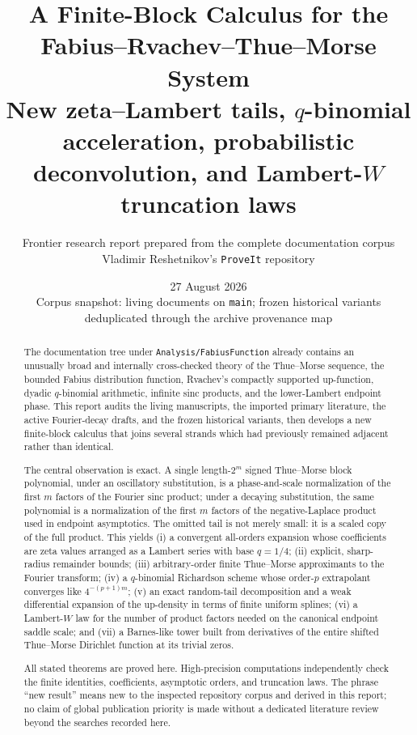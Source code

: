 \documentclass[11pt,oneside]{article}
\title{\bfseries A Finite-Block Calculus for the\\ Fabius--Rvachev--Thue--Morse System\\[0.4em]
\large New zeta--Lambert tails, $q$-binomial acceleration, probabilistic deconvolution, and Lambert-$W$ truncation laws}
\author{Frontier research report prepared from the complete documentation corpus\\
\small Vladimir Reshetnikov's \texttt{ProveIt} repository}
\date{27 August 2026\\
\small Corpus snapshot: living documents on \texttt{main}; frozen historical variants deduplicated through the archive provenance map}
\numberwithin{equation}{section}
\theoremstyle{definition}
\theoremstyle{remark}
\newcommand{\repo}{\nolinkurl{Analysis/FabiusFunction}}
\begin{document}
\maketitle

\begin{abstract}
The documentation tree under \repo{} already contains an unusually broad and internally
cross-checked theory of the Thue--Morse sequence, the bounded Fabius distribution function,
Rvachev's compactly supported up-function, dyadic $q$-binomial arithmetic, infinite sinc
products, and the lower-Lambert endpoint phase.  This report audits the living manuscripts,
the imported primary literature, the active Fourier-decay drafts, and the frozen historical
variants, then develops a new finite-block calculus that joins several strands which had
previously remained adjacent rather than identical.

The central observation is exact.  A single length-$2^m$ signed Thue--Morse block polynomial,
under an oscillatory substitution, is a phase-and-scale normalization of the first $m$ factors
of the Fourier sinc product; under a decaying substitution, the same polynomial is a
normalization of the first $m$ factors of the negative-Laplace product used in endpoint
asymptotics.  The omitted tail is not merely small: it is a scaled copy of the full product.
This yields (i) a convergent all-orders expansion whose coefficients are zeta values arranged
as a Lambert series with base $q=1/4$; (ii) explicit, sharp-radius remainder bounds;
(iii) arbitrary-order finite Thue--Morse approximants to the Fourier transform; (iv) a
$q$-binomial Richardson scheme whose order-$p$ extrapolant converges like
$4^{-(p+1)m}$; (v) an exact random-tail decomposition and a weak differential expansion of
the up-density in terms of finite uniform splines; (vi) a Lambert-$W$ law for the number of
product factors needed on the canonical endpoint saddle scale; and (vii) a Barnes-like tower
built from derivatives of the entire shifted Thue--Morse Dirichlet function at its trivial
zeros.

All stated theorems are proved here.  High-precision computations independently check the
finite identities, coefficients, asymptotic orders, and truncation laws.  The phrase
``new result'' means new to the inspected repository corpus and derived in this report; no
claim of global publication priority is made without a dedicated literature review beyond
the searches recorded here.
\end{abstract}
\end{document}

